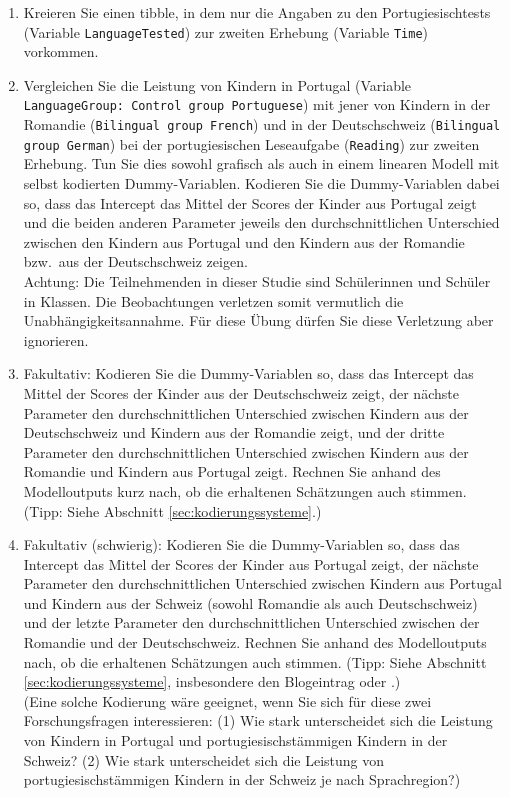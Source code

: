 \documentclass[oneside, 10pt]{book}\usepackage[]{graphicx}\usepackage[]{xcolor}
\begin{document}
\begin{enumerate}
\begin{enumerate}
  \item Kreieren Sie einen tibble, in dem nur die Angaben zu den Portugiesischtests (Variable \texttt{LanguageTested}) zur zweiten Erhebung (Variable \texttt{Time}) vorkommen.

  \item Vergleichen Sie die Leistung von Kindern in Portugal
  (Variable \texttt{LanguageGroup: Control group Portuguese}) mit jener von Kindern in der Romandie (\texttt{Bilingual group French})
  und in der Deutschschweiz (\texttt{Bilingual group German}) bei der portugiesischen Leseaufgabe (\texttt{Reading}) zur zweiten Erhebung.
  Tun Sie dies sowohl grafisch als auch in einem linearen Modell mit selbst kodierten
  Dummy-Variablen.
  Kodieren Sie die Dummy-Variablen dabei so, dass das Intercept das Mittel der Scores
  der Kinder aus Portugal zeigt und die beiden anderen Parameter jeweils den durchschnittlichen
  Unterschied zwischen den Kindern aus Portugal und den Kindern aus der Romandie bzw.\
  aus der Deutschschweiz zeigen.\\
  Achtung: Die Teilnehmenden in dieser Studie sind Schülerinnen und Schüler in Klassen.
  Die Beobachtungen verletzen somit vermutlich die Unabhängigkeitsannahme.
  Für diese Übung dürfen Sie diese Verletzung aber ignorieren.

  \item Fakultativ: Kodieren Sie die Dummy-Variablen so, dass das Intercept das Mittel
  der Scores der Kinder aus der Deutschschweiz zeigt, der nächste Parameter den durchschnittlichen
  Unterschied zwischen Kindern aus der Deutschschweiz und Kindern aus der Romandie zeigt,
  und der dritte Parameter den durchschnittlichen Unterschied zwischen Kindern aus der Romandie
  und Kindern aus Portugal zeigt. Rechnen Sie anhand des Modelloutputs kurz nach, ob die erhaltenen
  Schätzungen auch stimmen. (Tipp: Siehe Abschnitt \ref{sec:kodierungssysteme}.)

  \item Fakultativ (schwierig): Kodieren Sie die Dummy-Variablen so, dass das Intercept das Mittel
  der Scores der Kinder aus Portugal zeigt, der nächste Parameter den durchschnittlichen Unterschied zwischen Kindern aus Portugal und Kindern aus der Schweiz (sowohl Romandie als auch Deutschschweiz)
  und der letzte Parameter den durchschnittlichen Unterschied zwischen der Romandie und der Deutschschweiz. Rechnen Sie anhand des Modelloutputs nach, ob die erhaltenen
  Schätzungen auch stimmen. (Tipp: Siehe Abschnitt \ref{sec:kodierungssysteme}, insbesondere den Blogeintrag oder \citet{Schad2020}.)\\
  (Eine solche Kodierung wäre geeignet, wenn Sie sich für diese zwei Forschungsfragen interessieren: (1) Wie stark unterscheidet sich die Leistung von Kindern in Portugal und portugiesischstämmigen Kindern in der Schweiz? (2) Wie stark unterscheidet sich die Leistung von portugiesischstämmigen Kindern in der Schweiz je nach Sprachregion?)

 \end{enumerate}


\end{enumerate}
\end{document}
